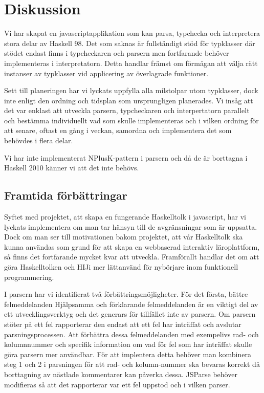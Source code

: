 \section{Diskussion}
Vi har skapat en javascriptapplikation som kan parsa, typchecka och interpretera stora delar av Haskell 98. Det som saknas är fullständigt stöd för typklasser där stödet endast finns i typcheckaren och parsern men fortfarande behöver implementeras i interpretatorn. Detta handlar främst om förmågan att välja rätt instanser av typklasser vid applicering av överlagrade funktioner.

Sett till planeringen har vi lyckats uppfylla alla milstolpar utom typklasser, dock inte enligt den ordning och tidsplan som ursprungligen planerades. 
Vi insåg att det var enklast att utveckla parsern, typcheckaren och interpertatorn parallelt och bestämma individuellt vad som skulle implementeras och i 
vilken ordning för att senare, oftast en gång i veckan, samordna och implementera det som behövdes i flera delar.

Vi har inte implementerat NPlusK-pattern i parsern och då de är borttagna i Haskell 2010 \citep{haskell2010} känner vi att det inte behövs.


\subsection{Framtida förbättringar}

Syftet med projektet, att skapa en fungerande Haskelltolk i javascript, har vi lyckats implementera om man tar hänsyn till de avgränsningar som är uppsatta. Dock om man ser till motivationen bakom projektet, att vår Haskelltolk ska kunna användas som grund för att skapa en webbaserad interaktiv läroplattform, så finns det fortfarande mycket kvar att utveckla. Framförallt handlar det om att göra Haskelltolken och HIJi mer lättanvänd för nybörjare inom funktionell programmering.

I parsern har vi identifierat två förbättringsmöjligheter. För det första, bättre felmeddelanden
Hjälpsamma och förklarande felmeddelanden är en viktigt del av ett utvecklingsverktyg och det generars för tillfället inte av parsern. 
Om parsern stöter på ett fel rapporterar den endast att ett fel har inträffat och avslutar parsningsprocessen. 
Att förbättra dessa felmeddelanden med exempelivs rad- och kolumnnummer och specifik information om vad för fel som har inträffat skulle göra parsern mer användbar.
För att implentera detta behöver man kombinera steg 1 och 2 i parsningen för att rad- och kolumn-nummer ska bevaras korrekt då borttagning av nästlade kommentarer kan påverka dessa.
JSParse behöver modifieras så att det rapporterar var ett fel uppstod och i vilken parser.

